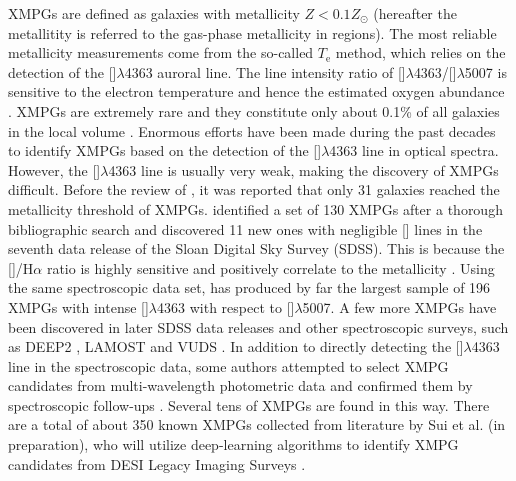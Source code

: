 \documentclass[twocolumn]{aastex631}
\newcommand{\Ha}{\mbox{H$\alpha$}}      %
\newcommand{\HII}{\mbox{\ion{H}{2}}}    %
\newcommand{\NII}{[\mbox{\ion{N}{2}}]}   %
\newcommand{\OIIIFIZ}{[\mbox{\ion{O}{3}}]$\lambda$5007}
\newcommand{\OIIIFOT}{[\mbox{\ion{O}{3}}]$\lambda$4363}
\newcommand{\Zsun}{\mbox{$Z_{\odot}$}}
\newcommand{\boldtext}[1]{\textcolor[rgb]{0,0,0}{#1}}
\begin{document}
XMPGs are defined as galaxies with metallicity $Z < 0.1\Zsun$ \boldtext{(hereafter the metallitity is referred to the gas-phase metallicity in {\HII} regions).} The most reliable metallicity measurements come from the so-called $T_\mathrm{e}$ method, which relies on the detection of the {\OIIIFOT} auroral line. The line intensity ratio of {\OIIIFOT/\OIIIFIZ} is sensitive to the electron temperature and hence the \boldtext{estimated} oxygen abundance \citep{All84,Nic14}. XMPGs are extremely rare and they constitute only about 0.1\% of all galaxies in the local volume \citep{Mor11}.  Enormous efforts have been made during the past decades to identify XMPGs based on the detection of the {\OIIIFOT} line in optical spectra. However, the {\OIIIFOT} line is usually very weak, making the discovery of XMPGs difficult. Before the review of \citet{Kun00}, it was reported that only 31 galaxies reached the metallicity threshold of XMPGs. \citet{Mor11} identified a set of 130 XMPGs after a thorough bibliographic search and discovered 11 new ones with negligible {\NII} lines in the seventh data release of the Sloan Digital Sky Survey (SDSS). \boldtext{This is because the {\NII}/{\Ha} ratio is highly sensitive and positively correlate to the metallicity \citep{Den02}.} Using the same spectroscopic data set, \citet{San16a} has produced by far the largest sample of 196 XMPGs with intense {\OIIIFOT} with respect to {\OIIIFIZ}. A few more XMPGs have been discovered in later SDSS data releases \citep[e.g., ][]{Gao18} and other spectroscopic surveys, such as DEEP2 \citep{LyC15}, LAMOST \citep{Gao17} and VUDS \citep{Amo14}. In addition to directly detecting the {\OIIIFOT} line in the spectroscopic data, some authors attempted to select XMPG candidates from multi-wavelength photometric data and confirmed them by spectroscopic follow-ups \citep{Bro08,Hsy18,Koj20,Iso22}. Several tens of XMPGs are found in this way. There are a total of about 350 known XMPGs collected from literature by Sui et al. (in preparation), \boldtext{who will} utilize deep-learning algorithms to identify XMPG candidates from DESI Legacy Imaging Surveys \citep{Zou17,Dey19}.  
\end{document}
